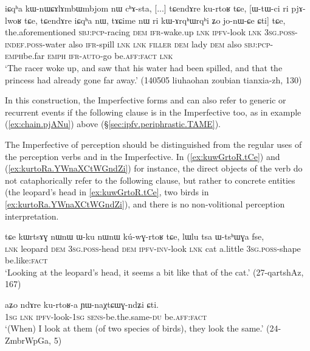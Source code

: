 \begin{exe}
\ex \label{ex:kurtoR.ipfv}
\gll  iɕqʰa kɯ-nɯɕɤlɤmbɯmbjom nɯ cʰɤ-sta, [...] tɕendɤre ku-rtoʁ tɕe, [ɯ-tɯ-ci ri pjɤ-lwoʁ tɕe, tɕendɤre iɕqʰa nɯ, tɤɕime nɯ ri kɯ-ɤrqʰɯ\redp{}rqʰi ʑo jo-nɯ-ɕe ɕti] tɕe, \\
the.aforementioned \textsc{sbj}:\textsc{pcp}-racing \textsc{dem} \textsc{ifr}-wake.up { } \textsc{lnk} \textsc{ipfv}-look \textsc{lnk} \textsc{3sg}.\textsc{poss}-\textsc{indef}.\textsc{poss}-water also \textsc{ifr}-spill  \textsc{lnk} \textsc{lnk} \textsc{filler} \textsc{dem} lady \textsc{dem} also \textsc{sbj}:\textsc{pcp}-\textsc{emph\redp}{}be.far \textsc{emph} \textsc{ifr}-\textsc{auto}-go be.\textsc{aff}:\textsc{fact} \textsc{lnk} \\
\glt `The racer woke up, and saw that his water had been spilled, and that the princess had already gone far away.' (140505 liuhaohan zoubian tianxia-zh, 130)
\end{exe}

In this construction, the Imperfective forms  and  can also refer to generic or recurrent events if the following clause is in the Imperfective too, as in example (\ref{ex:chain.pjANu}) above (§\ref{sec:ipfv.periphrastic.TAME}).

The Imperfective of perception should be distinguished from the regular uses of the perception verbs  and  in the Imperfective. In (\ref{ex:kuwGrtoR.tCe}) and (\ref{ex:kurtoRa.YWnaXCtWGndZi}) for instance, the direct objects of the verb  do not cataphorically refer to the following clause, but rather to concrete entities (the leopard's head in \ref{ex:kuwGrtoR.tCe}, two birds in \ref{ex:kurtoRa.YWnaXCtWGndZi}), and there is no non-volitional perception interpretation.


\begin{exe}
\ex \label{ex:kuwGrtoR.tCe}
\gll  tɕe kɯrtsɤɣ nɯnɯ ɯ-ku nɯnɯ kú-wɣ-rtoʁ tɕe, lɯlu tsa ɯ-tsʰɯɣa fse, \\
\textsc{lnk} leopard \textsc{dem} \textsc{3sg}.\textsc{poss}-head \textsc{dem} \textsc{ipfv}-\textsc{inv}-look \textsc{lnk} cat a.little \textsc{3sg}.\textsc{poss}-shape be.like:\textsc{fact} \\
\glt `Looking at the leopard's head, it seems a bit like that of the cat.' (27-qartshAz, 167)
\end{exe}

\begin{exe}
\ex \label{ex:kurtoRa.YWnaXCtWGndZi}
\gll  aʑo ndɤre ku-rtoʁ-a ɲɯ-naχtɕɯɣ-ndʑi ɕti. \\
\textsc{1sg} \textsc{lnk} \textsc{ipfv}-look-\textsc{1sg} \textsc{sens}-be.the.same-\textsc{du} be.\textsc{aff}:\textsc{fact} \\
\glt `(When) I look at them (of two species of birds), they look the same.' (24-ZmbrWpGa, 5)
\end{exe}

